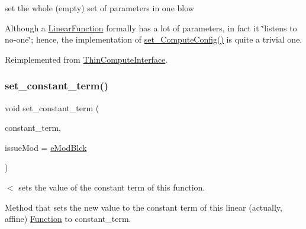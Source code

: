 set the whole (empty) set of parameters in one blow 

Although a \mbox{\hyperlink{class_s_m_spp__di__unipi__it_1_1_linear_function}{Linear\+Function}} formally has a lot of parameters, in fact it \char`\"{}listens to no-\/one\char`\"{}; hence, the implementation of \mbox{\hyperlink{class_s_m_spp__di__unipi__it_1_1_linear_function_af7a4779f8aa872d4a7ed3d2e0e62d29c}{set\+\_\+\+Compute\+Config()}} is quite a trivial one. 

Reimplemented from \mbox{\hyperlink{class_s_m_spp__di__unipi__it_1_1_thin_compute_interface_a8f4741c9baa5d7de2bd6129f3d08bf16}{Thin\+Compute\+Interface}}.

\mbox{\label{class_s_m_spp__di__unipi__it_1_1_linear_function_a7a2c08d9d2ada7a0a6e6a3ab3e25fd2c}} 
\subsubsection{\texorpdfstring{set\+\_\+constant\+\_\+term()}{set\_constant\_term()}}
{\footnotesize\ttfamily void set\+\_\+constant\+\_\+term (\begin{DoxyParamCaption}\item[{const \mbox{\hyperlink{class_s_m_spp__di__unipi__it_1_1_function_a9ad432406b609e28d340f73e9474bffe}{Function\+Value}}}]{constant\+\_\+term,  }\item[{\mbox{\hyperlink{group___modification___t_y_p_e_s_ga544246d8c462e9a2d817c2c30797968f}{c\+\_\+\+Mod\+Param}}}]{issue\+Mod = {\ttfamily \mbox{\hyperlink{group___modification___t_y_p_e_s_gga48fddcdd03a03f49b7e389ca1ed938d4a21b14b26b1c0093a0905f6fc010bad29}{e\+Mod\+Blck}}} }\end{DoxyParamCaption})}



$<$ sets the value of the constant term of this function. 

Method that sets the new value to the constant term of this linear (actually, affine) \mbox{\hyperlink{class_s_m_spp__di__unipi__it_1_1_function}{Function}} to constant\+\_\+term.


